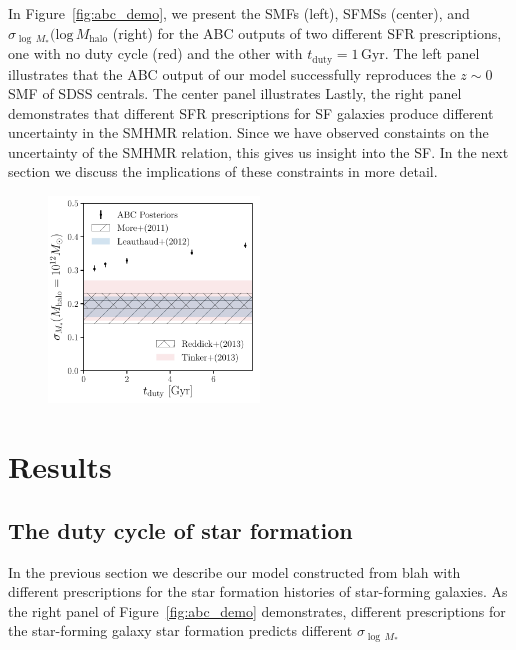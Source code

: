 \documentclass[12pt, letterpaper, preprint]{aastex}
\begin{document}
In Figure~\ref{fig:abc_demo}, we present the SMFs (left), SFMSs (center), and 
$\sigma_{\log\,M_*}(\mathrm{log}\,M_\mathrm{halo}$ (right) for the ABC outputs 
of two different SFR prescriptions, one with no duty cycle (red) and the other 
with $t_\mathrm{duty} = 1\,\mathrm{Gyr}$. The left panel illustrates that the 
ABC output of our model successfully reproduces the $z \sim 0$ SMF of SDSS 
centrals. The center panel illustrates
Lastly, the right panel demonstrates that different SFR prescriptions for  
SF galaxies produce different uncertainty in the SMHMR relation. Since we have
observed constaints on the uncertainty of the SMHMR relation, this gives us
insight into the SF. In the next section we discuss the implications of 
these constraints in more detail. 

\begin{figure}
\begin{center}
\includegraphics[width=0.5\textwidth]{figs/sigMstar_tduty.pdf}
\caption{}
\label{fig:sigMstar_duty}
\end{center}
\end{figure}

\section{Results}
\subsection{The duty cycle of star formation}
In the previous section we describe our model constructed from blah with different
prescriptions for the star formation histories of star-forming galaxies. As the 
right panel of Figure~\ref{fig:abc_demo} demonstrates, different prescriptions for 
the star-forming galaxy star formation predicts different $\sigma_{\log\,M_*}$ 
\end{document}
